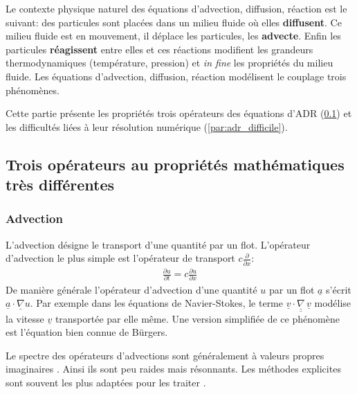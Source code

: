 Le contexte physique naturel des équations d'advection, diffusion, réaction est le suivant:
des particules sont placées dans un milieu fluide où elles \textbf{diffusent}. Ce milieu fluide
est en mouvement, il déplace les particules, les \textbf{advecte}.
Enfin les particules \textbf{réagissent} entre elles et ces réactions modifient les grandeurs thermodynamiques (température, pression) et \textit{in fine} les propriétés
du milieu fluide.
Les équations d'advection, diffusion, réaction modélisent le couplage trois phénomènes.\par 
Cette partie présente les propriétés trois opérateurs des équations d'ADR (\ref{par:adr_3_operator}) et
les difficultés liées à leur résolution numérique (\ref{par:adr_difficile}).

\subsection{Trois opérateurs au propriétés mathématiques très différentes}\label{par:adr_3_operator}
\subsubsection{Advection}
    L'advection désigne le transport d'une quantité par un flot. L'opérateur d'advection le plus simple est l'opérateur
    de transport $c \frac{\partial}{\partial x}$:
    \begin{align}\frac{\partial u}{\partial t} = c \frac{\partial u}{\partial x}\end{align}
    De manière générale l'opérateur d’advection d'une quantité $u$ par un flot $\underline a$ s'écrit $\underline a \cdot \underline{\nabla} u$.
    Par exemple dans les équations de Navier-Stokes, le terme $\underline{v} \cdot \underline{\underline \nabla} \, \underline{v}$ modélise 
    la vitesse $\underline v$ transportée par elle même. Une version simplifiée de ce phénomène est l'équation bien connue de Bürgers.\par 
    Le spectre des opérateurs d'advections sont généralement à valeurs propres imaginaires \cite{}.
    Ainsi ils sont peu raides mais résonnants. Les méthodes explicites sont souvent les plus adaptées pour les traiter \cite{}.

